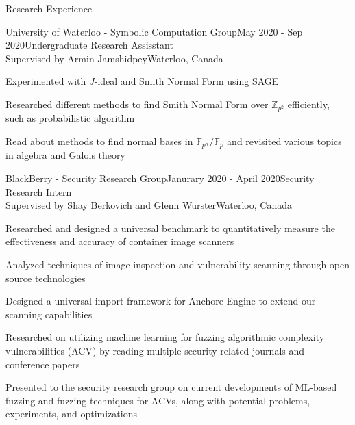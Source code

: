 \documentclass{cv}
\begin{document}
\begin{rSection}{Research Experience}
\begin{rSubsection}{University of Waterloo - Symbolic Computation Group}{May 2020 - Sep 2020}{Undergraduate Research Assisstant \\ Supervised by Armin Jamshidpey}{Waterloo, Canada}
	\item Experimented with $J$-ideal and Smith Normal Form using SAGE
  	\item Researched different methods to find Smith Normal Form over $\mathbb{Z}_{p^2}$ efficiently, such as probabilistic algorithm
  	\item Read about methods to find normal bases in $\mathbb{F}_{p^n}/\mathbb{F}_{p}$ and revisited various topics in algebra and Galois theory
\end{rSubsection}

\begin{rSubsection}{BlackBerry - Security Research Group}{Janurary 2020 - April 2020}{Security Research Intern \\ Supervised by Shay Berkovich and Glenn Wurster}{Waterloo, Canada}
	\item Researched and designed a universal benchmark to quantitatively measure the effectiveness and accuracy of container image scanners
	\item Analyzed techniques of image inspection and vulnerability scanning through open source technologies
	\item Designed a universal import framework for Anchore Engine to extend our scanning capabilities
	\item Researched on utilizing machine learning for fuzzing algorithmic complexity vulnerabilities (ACV) by reading multiple security-related journals and conference papers
	\item Presented to the security research group on current developments of ML-based fuzzing and fuzzing techniques for ACVs, along with potential problems, experiments, and optimizations
\end{rSubsection}
\end{rSection}
\end{document}
